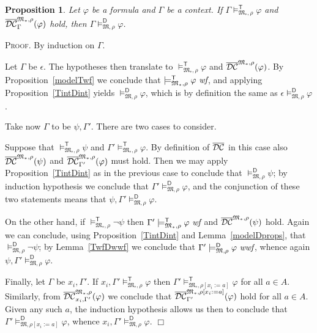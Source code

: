 \documentclass{article}
\newtheorem{proposition}[definition]{Proposition}
\newenvironment{proof}{\smallskip\textsc{Proof.}}{\hspace*{\fill}$\Box$}
\newcommand{\modelfunm}[1]{\ensuremath{\mathfrak{#1}_\ast}}
\newcommand{\modelfun}[1]{\ensuremath{{#1}_\ast}}
\newcommand{\wf}{\ \mbox{\em wf}}
\newcommand{\wwf}{\ \mbox{\em wwf}}
\newcommand{\mymodelss}[3]{\ensuremath{\models_{\mathfrak{#2},{#3}}^{\mathsf{#1}}}}
\newcommand{\semDC}[2][{\mathfrak M},\rho]{\ensuremath{\overline{\cal{DC}}^{#1}_{#2}}}
\newcommand{\semDCa}[1]{\semDC[{\modelfunm M,\rho}]{#1}}
\begin{document}
\begin{proposition}\label{TconsDcons}
Let $\varphi$ be a formula and $\Gamma$ be a context.  If
$\Gamma\mymodelss{T}{\modelfun M}\rho\varphi$ and $\semDCa{\Gamma}(\varphi)$
hold, then $\Gamma\mymodelss{D}{M}\rho\varphi$.
\end{proposition}
\begin{proof}
By induction on $\Gamma$.

Let $\Gamma$ be $\epsilon$.  The hypotheses then translate to
$\mymodelss{T}{\modelfun M}\rho\varphi$ and $\semDCa{}(\varphi)$.
By Proposition~\ref{modelTwf} we conclude that
$\mymodelss{T}{\modelfun M}\rho\varphi\wf$, and
applying Proposition~\ref{TintDint} yields
$\mymodelss{D}M\rho\varphi$, which is by definition the same as
$\epsilon\mymodelss{D}M\rho\varphi$.

Take now $\Gamma$ to be $\psi,\Gamma'$.  There are two cases to
consider.

Suppose that $\mymodelss{T}{\modelfun M}\rho\psi$ and
$\Gamma'\mymodelss{T}{\modelfun M}\rho\varphi$.  By definition of
$\semDC[{}]{}$ in this case also $\semDCa{}(\psi)$ and
$\semDCa{\Gamma'}(\varphi)$ must hold.  Then we may apply
Proposition~\ref{TintDint} as in the previous case to conclude that
$\mymodelss{D}M\rho\psi$; by induction hypothesis we conclude that
$\Gamma'\mymodelss{D}M\rho\varphi$, and the conjunction of these two
statements means that $\psi,\Gamma'\mymodelss{D}M\rho\varphi$.

On the other hand, if $\mymodelss{T}{\modelfun M}\rho\neg\psi$
then $\Gamma'\mymodelss{T}{\modelfun M}\rho\varphi\wf$ and
$\semDCa{}(\psi)$ hold.  Again we can conclude, using
Proposition~\ref{TintDint} and Lemma~\ref{modelDprops}, that
$\mymodelss{D}M\rho\neg\psi$; by Lemma~\ref{TwfDwwf} we conclude that
$\Gamma'\mymodelss{D}M\rho\varphi\wwf$, whence again
$\psi,\Gamma'\mymodelss{D}M\rho\varphi$.

Finally, let $\Gamma$ be $x_i,\Gamma'$.  If
$x_i,\Gamma'\mymodelss{T}{\modelfun M}\rho\varphi$ then
$\Gamma'\mymodelss{T}{\modelfun M}{\rho[x_i:=a]}\varphi$ for all $a\in A$.
Similarly, from $\semDCa{x_i,\Gamma'}(\varphi)$ we conclude that
$\semDC[{\modelfunm M},{\rho[x_i:=a]}]{\Gamma'}(\varphi)$ hold for all
$a\in A$.  Given any such $a$, the induction hypothesis allows us then
to conclude that $\Gamma'\mymodelss{D}M{\rho[x_i:=a]}\varphi$,
whence $x_i,\Gamma'\mymodelss{D}M\rho\varphi$.
\end{proof}
\end{document}
